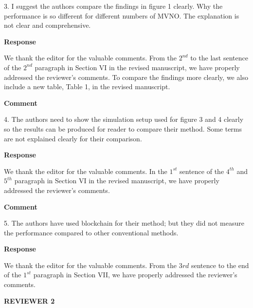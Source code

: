 \documentclass[12pt,draftcls, onecolumn]{IEEEtran}
\begin{document}
3. I suggest the authors compare the findings in figure 1 clearly. Why the performance is so different for different numbers of MVNO. The explanation is not clear and comprehensive.

\vspace{3mm}
\noindent\textcolor[rgb]{0.00,0.00,1.00}{\textbf{Response}}
\vspace{3mm}

We thank the editor for the valuable comments. From the $ 2^{nd} $ to the last sentence of the $ 2^{nd} $ paragraph in Section VI in the revised manuscript, we have properly addressed the reviewer's comments. To compare the findings more clearly, we also include a new table, Table 1, in the revised manuscript.

\vspace{3mm}
\noindent\textcolor[rgb]{1.00,0.00,0.00}{\textbf{Comment}}
\vspace{3mm}

4. The authors need to show the simulation setup used for figure 3 and 4 clearly so the results can be produced for reader to compare their method. Some terms are not explained clearly for their comparison.

\vspace{3mm}
\noindent\textcolor[rgb]{0.00,0.00,1.00}{\textbf{Response}}
\vspace{3mm}

We thank the editor for the valuable comments. In the $ 1^{st} $ sentence of the $ 4^{th} $ and $ 5^{th} $ paragraph in Section VI in the revised manuscript, we have properly addressed the reviewer's comments. 

\vspace{3mm}
\noindent\textcolor[rgb]{1.00,0.00,0.00}{\textbf{Comment}}
\vspace{3mm}

5. The authors have used blockchain for their method; but they did not measure the performance compared to other conventional methods.

\vspace{3mm}
\noindent\textcolor[rgb]{0.00,0.00,1.00}{\textbf{Response}}
\vspace{3mm}

We thank the editor for the valuable comments. From the $ 3{rd} $ sentence to the end of the $ 1^{st} $ paragraph in Section VII, we have properly addressed the reviewer's comments.

\newpage

\vspace{5mm} \noindent\textcolor[rgb]{1.00,0.00,0.00}{\textbf{REVIEWER 2}}
\end{document}
